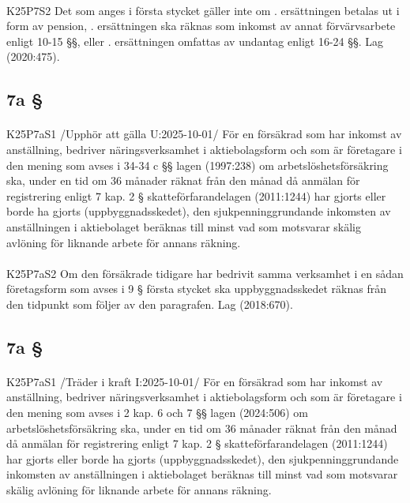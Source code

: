 \documentclass[a4paper,notitlepage,openany,10pt]{book}
\begin{document}
\paragraph*{}
{\tiny K25P7S2}
Det som anges i första stycket gäller inte om
. ersättningen betalas ut i form av pension,
. ersättningen ska räknas som inkomst av annat förvärvsarbete enligt 10-15 §§, eller
. ersättningen omfattas av undantag enligt 16-24 §§.
Lag (2020:475).
\subsection*{7a §}
\paragraph*{}
{\tiny K25P7aS1}
/Upphör att gälla U:2025-10-01/
För en försäkrad som har inkomst av anställning, bedriver näringsverksamhet i aktiebolagsform och som är företagare i den mening som avses i 34-34 c §§ lagen (1997:238) om arbetslöshetsförsäkring ska, under en tid om 36 månader räknat från den månad då anmälan för registrering enligt 7 kap. 2 § skatteförfarandelagen (2011:1244) har gjorts eller borde ha gjorts (uppbyggnadsskedet), den sjukpenninggrundande inkomsten av anställningen i aktiebolaget beräknas till minst vad som motsvarar skälig avlöning för liknande arbete för annans räkning.
\paragraph*{}
{\tiny K25P7aS2}
Om den försäkrade tidigare har bedrivit samma verksamhet i en sådan företagsform som avses i 9 § första stycket ska uppbyggnadsskedet räknas från den tidpunkt som följer av den paragrafen.
Lag (2018:670).
\subsection*{7a §}
\paragraph*{}
{\tiny K25P7aS1}
/Träder i kraft I:2025-10-01/
För en försäkrad som har inkomst av anställning, bedriver näringsverksamhet i aktiebolagsform och som är företagare i den mening som avses i 2 kap. 6 och 7 §§ lagen (2024:506) om arbetslöshetsförsäkring ska, under en tid om 36 månader räknat från den månad då anmälan för registrering enligt 7 kap. 2 § skatteförfarandelagen (2011:1244) har gjorts eller borde ha gjorts (uppbyggnadsskedet), den sjukpenninggrundande inkomsten av anställningen i aktiebolaget beräknas till minst vad som motsvarar skälig avlöning för liknande arbete för annans räkning.
\end{document}
